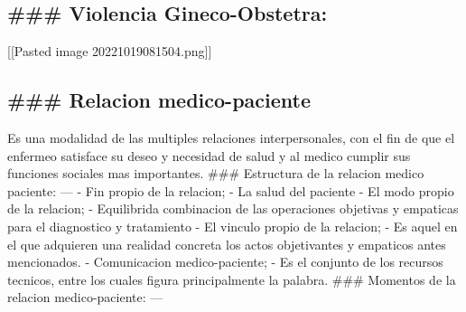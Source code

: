 \documentclass[
]{article}
\begin{document}
\hypertarget{violencia-gineco-obstetra}{%
\subsection{\#\#\# Violencia
Gineco-Obstetra:}\label{violencia-gineco-obstetra}}

{[}{[}Pasted image 20221019081504.png{]}{]}

\hypertarget{relacion-medico-paciente}{%
\subsection{\#\#\# Relacion
medico-paciente}\label{relacion-medico-paciente}}

Es una modalidad de las multiples relaciones interpersonales, con el fin
de que el enfermeo satisface su deseo y necesidad de salud y al medico
cumplir sus funciones sociales mas importantes. \#\#\# Estructura de la
relacion medico paciente: --- - Fin propio de la relacion; - La salud
del paciente - El modo propio de la relacion; - Equilibrida combinacion
de las operaciones objetivas y empaticas para el diagnostico y
tratamiento - El vinculo propio de la relacion; - Es aquel en el que
adquieren una realidad concreta los actos objetivantes y empaticos antes
mencionados. - Comunicacion medico-paciente; - Es el conjunto de los
recursos tecnicos, entre los cuales figura principalmente la palabra.
\#\#\# Momentos de la relacion medico-paciente: ---
\end{document}
